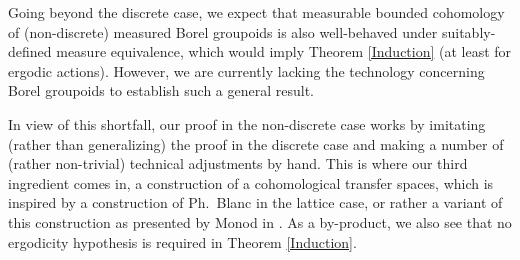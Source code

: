 \documentclass[11pt, oneside]{amsart}
\theoremstyle{definition}
\theoremstyle{remark}
\theoremstyle{TheoremNum}
\begin{document}
Going beyond the discrete case, we expect that measurable bounded cohomology of (non-discrete) measured Borel groupoids is also well-behaved under suitably-defined measure equivalence, which would imply Theorem \ref{Induction} (at least for ergodic actions). However, we are currently lacking the technology concerning Borel groupoids to establish such a general result. 

In view of this shortfall, our proof in the non-discrete case works by imitating (rather than generalizing) the proof in the discrete case and making a number of (rather non-trivial) technical adjustments by hand. This is where our third ingredient comes in, a construction of a cohomological transfer spaces, which is inspired by a construction of Ph.\ Blanc \cite{Blanc} in the lattice case, or rather a variant of this construction as presented by Monod in \cite{monod:libro}. As a by-product, we also see that no ergodicity hypothesis is required in Theorem \ref{Induction}.
\end{document}
